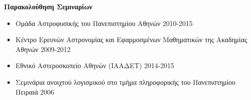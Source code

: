 \documentclass[a4paper,12pt,final]{memoir}
\newcommand{\SmallSep}{\vspace{0.25em}}
\newcommand{\CVItem}[2]
	{\textbf{\color{RoyalBlue} #1} #2}
\newcommand{\location}[1]{ %
\small{\color{headings}#1}}
\newenvironment{tightitemize} %
{\vspace{-\topsep}\begin{itemize}\itemsep1pt \parskip0pt \parsep0pt}
{\end{itemize}\vspace{-\topsep}}
\begin{document}
\clearpage
\framebreak
\framebreak

\CVItem{Παρακολούθηση Σεμιναρίων}{}
\begin{tightitemize}
\item Ομάδα Αστροφυσικής του Πανεπιστημίου Αθηνών \location{2010-2015}
\item Κέντρο Ερευνών Αστρονομίας και Εφαρμοσμένων Μαθηματικών της Ακαδημίας Αθηνών \location{2009-2012}
\item Εθνικό Αστεροσκοπείο Αθηνών (ΙΑΑΔΕΤ) \location{2014-2015}
\item Σεμινάρια ανοιχτού λογισμικού στο τμήμα πληροφορικής του Πανεπιστημίου Πειραιά \location{2006}
\end{tightitemize}
\SmallSep


\end{document}
